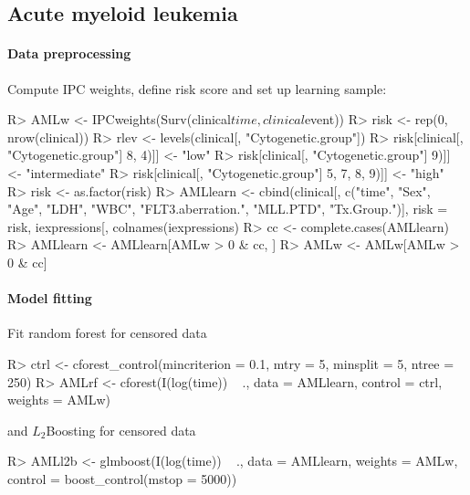\documentclass{article}
\newenvironment{Schunk}{}{}
\begin{document}
\subsection{Acute myeloid leukemia}



\paragraph{Data preprocessing}

Compute IPC weights, define risk score and set up learning sample:
\begin{Schunk}
\begin{Sinput}
R> AMLw <- IPCweights(Surv(clinical$time, clinical$event))
R> risk <- rep(0, nrow(clinical))
R> rlev <- levels(clinical[, "Cytogenetic.group"])
R> risk[clinical[, "Cytogenetic.group"] %
         8, 4)]] <- "low"
R> risk[clinical[, "Cytogenetic.group"] %
         9)]] <- "intermediate"
R> risk[clinical[, "Cytogenetic.group"] %
         5, 7, 8, 9)]] <- "high"
R> risk <- as.factor(risk)
R> AMLlearn <- cbind(clinical[, c("time", "Sex", 
         "Age", "LDH", "WBC", "FLT3.aberration.", "MLL.PTD", 
         "Tx.Group.")], risk = risk, iexpressions[, 
         colnames(iexpressions) %
R> cc <- complete.cases(AMLlearn)
R> AMLlearn <- AMLlearn[AMLw > 0 & cc, ]
R> AMLw <- AMLw[AMLw > 0 & cc]
\end{Sinput}
\end{Schunk}

\paragraph{Model fitting}

Fit random forest for censored data
\begin{Schunk}
\begin{Sinput}
R> ctrl <- cforest_control(mincriterion = 0.1, mtry = 5, 
         minsplit = 5, ntree = 250)
R> AMLrf <- cforest(I(log(time)) ~ ., data = AMLlearn, 
         control = ctrl, weights = AMLw)
\end{Sinput}
\end{Schunk}
and $L_2$Boosting for censored data
\begin{Schunk}
\begin{Sinput}
R> AMLl2b <- glmboost(I(log(time)) ~ ., data = AMLlearn, 
         weights = AMLw, control = boost_control(mstop = 5000))
\end{Sinput}
\end{Schunk}
\end{document}
